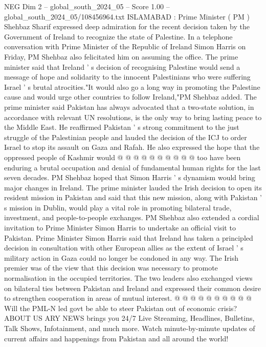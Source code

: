 \begin{textsample}{NEG Dim 2 – global\_south\_2024\_05 – Score 1.00 – global\_south\_2024\_05/108456964.txt}  \label{ex:f2_neg_373}
ISLAMABAD : Prime Minister ( PM ) Shehbaz Sharif expressed deep admiration for the recent decision taken by the Government of Ireland to recognize the state of Palestine.
In a telephone conversation with Prime Minister of the Republic of Ireland Simon Harris on Friday, PM Shehbaz also felicitated him on assuming the office.
The prime minister said that Ireland ' s decision of recognising Palestine would send a message of hope and solidarity to the innocent Palestinians who were suffering Israel ' s brutal atrocities."It would also go a long way in promoting the Palestine cause and would urge other countries to follow Ireland,"PM Shehbaz added.
The prime minister said Pakistan has always advocated that a two-state solution, in accordance with relevant UN resolutions, is the only way to bring lasting peace to the Middle East.
He reaffirmed Pakistan ' s strong commitment to the just struggle of the Palestinian people and lauded the decision of the ICJ to order Israel to stop its assault on Gaza and Rafah.
He also expressed the hope that the oppressed people of Kashmir would @ @ @ @ @ @ @ @ @ @ too have been enduring a brutal occupation and denial of fundamental human rights for the last seven decades.
PM Shehbaz hoped that Simon Harris ' s dynamism would bring major changes in Ireland.
The prime minister lauded the Irish decision to open its resident mission in Pakistan and said that this new mission, along with Pakistan ' s mission in Dublin, would play a vital role in promoting bilateral trade, investment, and people-to-people exchanges.
PM Shehbaz also extended a cordial invitation to Prime Minister Simon Harris to undertake an official visit to Pakistan.
Prime Minister Simon Harris said that Ireland has taken a principled decision in consultation with other European allies as the extent of Israel ' s military action in Gaza could no longer be condoned in any way.
The Irish premier was of the view that this decision was necessary to promote normalisation in the occupied territories.
The two leaders also exchanged views on bilateral ties between Pakistan and Ireland and expressed their common desire to strengthen cooperation in areas of mutual interest. @ @ @ @ @ @ @ @ @ @ Will the PML-N led govt be able to steer Pakistan out of economic crisis?
ABOUT US ARY NEWS brings you 24/7 Live Streaming, Headlines, Bulletins, Talk Shows, Infotainment, and much more.
Watch minute-by-minute updates of current affairs and happenings from Pakistan and all around the world!

\end{textsample}
